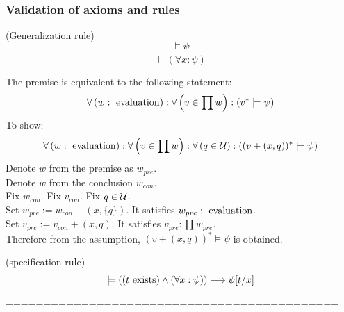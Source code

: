 \subsubsection{Validation of axioms and rules}
\begin{theorem}(Generalization rule)
\[
\frac{
\models \psi
}{
\models (\forall x:\psi)
}
\]
\end{theorem}
\Proof
The premise is equivalent to the following statement:
\[
\forall \left(w:\mathrm{\ evaluation}\right):
\forall \left(v\in\prod w\right):
(v^*\models \psi)
\]
To show:
\[
\forall \left(w:\mathrm{\ evaluation}\right):
\forall \left(v\in\prod w\right):
\forall \left(q\in\mathcal{U}\right):
((v+(x,q))^*\models \psi)
\]
Denote $w$ from the premise as $w_{pre}$.\\
Denote $w$ from the conclusion $w_{con}$.\\
Fix $w_{con}$. Fix $v_{con}$. Fix $q\in\mathcal{U}$.\\
Set $w_{pre}:= w_{con} + (x,\{q\})$. It satisfies $w_{pre}:\mathrm{\ evaluation}$.\\
Set $v_{pre}:= v_{con} + (x,q)$. It satisfies $v_{pre}:\prod w_{pre}$.\\
Therefore from the assumption, $(v+(x,q))^*\models \psi$ is obtained.\\
\Done

\begin{theorem}(specification rule)
\[
\models ((t\mathrm{\ exists})\land(\forall x:\psi))\longrightarrow\psi[t/x]
\]
\end{theorem}
\Proof
\Done


============================================\\
